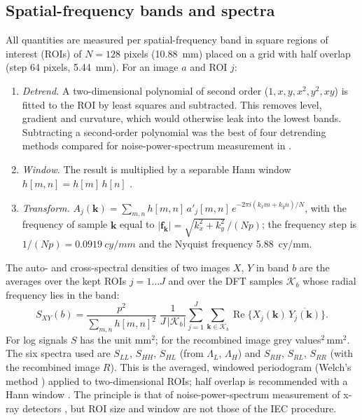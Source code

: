 \documentclass[11pt,a4paper]{article}
\newcommand{\LL}{\Lambda_L}
\newcommand{\LH}{\Lambda_H}
\begin{document}
\subsection{Spatial-frequency bands and spectra}\label{sec:spectra}
All quantities are measured per spatial-frequency band in square regions of interest (ROIs) of $N=128$ pixels
(\SI{10.88}{mm}) placed on a grid with half overlap (step 64 pixels, \SI{5.44}{mm}). For an image $a$ and ROI $j$:
\begin{enumerate}
\item \emph{Detrend.} A two-dimensional polynomial of second order
($1,x,y,x^2,y^2,xy$) is fitted to the ROI by least squares and subtracted. This removes level, gradient and curvature,
which would otherwise leak into the lowest bands. Subtracting a second-order polynomial was the best of four
detrending methods compared for noise-power-spectrum measurement in \cite{zhou2011}.
\item \emph{Window.} The result is multiplied by a separable Hann window $h[m,n]=h[m]\,h[n]$ \cite{harris1978}.
\item \emph{Transform.} $A_j(\mathbf k)=\sum_{m,n} h[m,n]\,a'_j[m,n]\,e^{-2\pi i(k_x m+k_y n)/N}$, with the frequency of
sample $\mathbf k$ equal to $|\mathbf f_{\mathbf k}|=\sqrt{k_x^2+k_y^2}\,/(Np)$; the frequency step is
$1/(Np)=\SI{0.0919}{cy/mm}$ and the Nyquist frequency \SI{5.88}{cy/mm}.
\end{enumerate}
The auto- and cross-spectral densities of two images $X$, $Y$ in band $b$ are the averages over the kept ROIs
$j=1\ldots J$ and over the DFT samples $\mathcal K_b$ whose radial frequency lies in the band:
\begin{equation}
S_{XY}(b)=\frac{p^2}{\sum_{m,n}h[m,n]^2}\;\frac{1}{J\,|\mathcal K_b|}\sum_{j=1}^{J}\sum_{\mathbf k\in\mathcal K_b}
\operatorname{Re}\!\big\{X_j(\mathbf k)\,\overline{Y_j(\mathbf k)}\big\}.
\label{eq:psd}
\end{equation}
For log signals $S$ has the unit mm$^2$; for the recombined image grey values$^2\,$mm$^2$. The six spectra used
are $S_{LL}$, $S_{HH}$, $S_{HL}$ (from $\LL$, $\LH$) and $S_{RH}$, $S_{RL}$, $S_{RR}$ (with the recombined image $R$).
This is the averaged, windowed periodogram (Welch's method \cite{welch1967}) applied to two-dimensional ROIs; half
overlap is recommended with a Hann window \cite{carter1973}. The principle is that of noise-power-spectrum
measurement of x-ray detectors \cite{dobbins2006,iec62220}, but ROI size and window are not those of the IEC
procedure.
\end{document}
